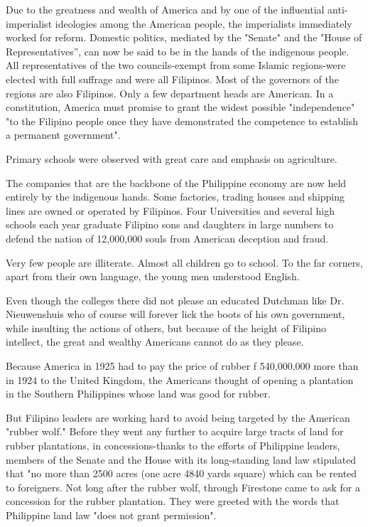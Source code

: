 Due to the greatness and wealth of America and by one of the influential anti-imperialist 
ideologies among the American people, the imperialists immediately worked for reform. 
Domestic politics, mediated by the "Senate" and the "House of Representatives'', can now 
be said to be in the hands of the indigenous people. All representatives of the two councils-exempt 
from some Islamic regions-were elected with full suffrage and were all Filipinos. Most of the 
governors of the regions are also Filipinos. Only a few department heads are American. In a 
constitution, America must promise to grant the widest possible "independence" "to the Filipino 
people once they have demonstrated the competence to establish a permanent government".\vskip 0.2in

Primary schools were observed with great care and emphasis on agriculture.\vskip 0.2in

The companies that are the backbone of the Philippine economy are now held entirely 
by the indigenous hands. Some factories, trading houses and shipping lines are owned 
or operated by Filipinos. Four Universities and several high schools each year graduate 
Filipino sons and daughters in large numbers to defend the nation of 12,000,000 souls from American deception and fraud.\vskip 0.2in

Very few people are illiterate. Almost all children go to school. To the far corners, 
apart from their own language, the young men understood English.\vskip 0.2in

Even though the colleges there did not please an educated Dutchman like Dr. Nieuwenshuis 
who of course will forever lick the boots of his own government, while insulting the actions 
of others, but because of the height of Filipino intellect, the great and wealthy Americans cannot do as they please.\vskip 0.2in

Because America in 1925 had to pay the price of rubber f 540,000,000 more than in 1924 to 
the United Kingdom, the Americans thought of opening a plantation in the Southern Philippines whose land was good for rubber.\vskip 0.2in

But Filipino leaders are working hard to avoid being targeted by the American "rubber wolf." 
Before they went any further to acquire large tracts of land for rubber plantations, in 
concessions-thanks to the efforts of Philippine leaders, members of the Senate and the House 
with its long-standing land law stipulated that "no more than 2500 acres (one acre 4840 yards square) 
which can be rented to foreigners. Not long after the rubber wolf, through Firestone came to ask for a 
concession for the rubber plantation. They were greeted with the words that Philippine land law "does not grant permission".\vskip 0.2in

